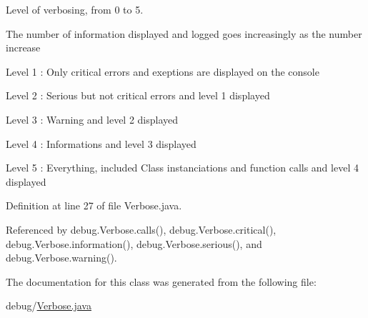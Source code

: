 Level of verbosing, from 0 to 5. 

The number of information displayed and logged goes increasingly as the number increase
\begin{DoxyItemize}
\item Level 1 \-: Only critical errors and exeptions are displayed on the console
\item Level 2 \-: Serious but not critical errors and level 1 displayed
\item Level 3 \-: Warning and level 2 displayed
\item Level 4 \-: Informations and level 3 displayed
\item Level 5 \-: Everything, included Class instanciations and function calls and level 4 displayed 
\end{DoxyItemize}

Definition at line 27 of file Verbose.\-java.



Referenced by debug.\-Verbose.\-calls(), debug.\-Verbose.\-critical(), debug.\-Verbose.\-information(), debug.\-Verbose.\-serious(), and debug.\-Verbose.\-warning().



The documentation for this class was generated from the following file\-:\begin{DoxyCompactItemize}
\item 
debug/\hyperlink{a00042}{Verbose.\-java}\end{DoxyCompactItemize}
